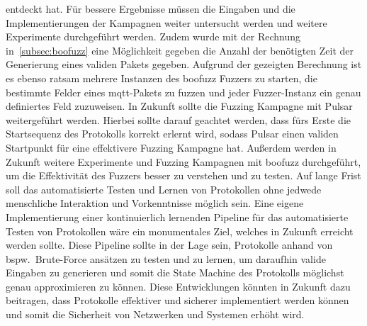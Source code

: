 entdeckt hat.
Für bessere Ergebnisse müssen die Eingaben und die Implementierungen der Kampagnen weiter untersucht werden und weitere
Experimente durchgeführt werden.\newline
Zudem wurde mit der Rechnung in~\ref{subsec:boofuzz} eine Möglichkeit gegeben die Anzahl der benötigten Zeit der Generierung
eines validen Pakets gegeben.
Aufgrund der gezeigten Berechnung ist es ebenso ratsam mehrere Instanzen des boofuzz Fuzzers zu starten, die bestimmte Felder
eines \gls{mqtt}-Pakets zu fuzzen und jeder Fuzzer-Instanz ein genau definiertes Feld zuzuweisen.\newline\newline
In Zukunft sollte die Fuzzing Kampagne mit Pulsar weitergeführt werden.
Hierbei sollte darauf geachtet werden, dass fürs Erste die Startsequenz des Protokolls korrekt erlernt wird, sodass Pulsar
einen validen Startpunkt für eine effektivere Fuzzing Kampagne hat.
Außerdem werden in Zukunft weitere Experimente und Fuzzing Kampagnen mit boofuzz durchgeführt, um die Effektivität des
Fuzzers besser zu verstehen und zu testen.
Auf lange Frist soll das automatisierte Testen und Lernen von Protokollen ohne jedwede menschliche Interaktion und
Vorkenntnisse möglich sein.
Eine eigene Implementierung einer kontinuierlich lernenden Pipeline für das automatisierte Testen von Protokollen wäre
ein monumentales Ziel, welches in Zukunft erreicht werden sollte.
Diese Pipeline sollte in der Lage sein, Protokolle anhand von bspw.\ Brute-Force ansätzen zu testen und zu lernen, um
daraufhin valide Eingaben zu generieren und somit die State Machine des Protokolls möglichst genau approximieren zu können.
Diese Entwicklungen könnten in Zukunft dazu beitragen, dass Protokolle effektiver und sicherer implementiert werden können
und somit die Sicherheit von Netzwerken und Systemen erhöht wird.